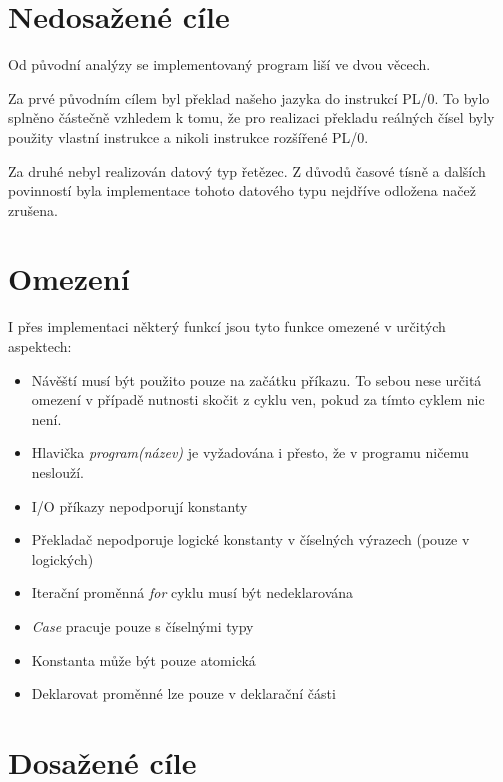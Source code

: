 \documentclass[
12pt,
a4paper,
pdftex,
czech,
titlepage
]{report}
\begin{document}
\section{Nedosažené cíle}
Od původní analýzy se implementovaný program liší ve dvou věcech.

 Za prvé původním cílem byl překlad našeho jazyka do instrukcí PL/0. To bylo splněno částečně vzhledem k tomu, že pro realizaci překladu reálných čísel byly použity vlastní instrukce a nikoli instrukce rozšířené PL/0.
 
 Za druhé nebyl realizován datový typ řetězec. Z důvodů časové tísně a dalších povinností byla implementace tohoto datového typu nejdříve odložena načež zrušena. 

\section{Omezení}

I přes implementaci některý funkcí jsou tyto funkce omezené v určitých aspektech:

\begin{itemize}
\item Návěští musí být použito pouze na začátku příkazu. To sebou nese určitá omezení v případě nutnosti skočit z cyklu ven, pokud za tímto cyklem nic není.
\item Hlavička \textit{program(název)} je vyžadována i přesto, že v programu ničemu neslouží.
\item I/O příkazy nepodporují konstanty
\item Překladač nepodporuje logické konstanty v číselných výrazech (pouze v logických)
\item Iterační proměnná \textit{for} cyklu musí být nedeklarována
\item \textit{Case} pracuje pouze s číselnými typy
\item Konstanta může být pouze atomická
\item Deklarovat proměnné lze pouze v deklarační části
\end{itemize}

\section{Dosažené cíle}
\end{document}
